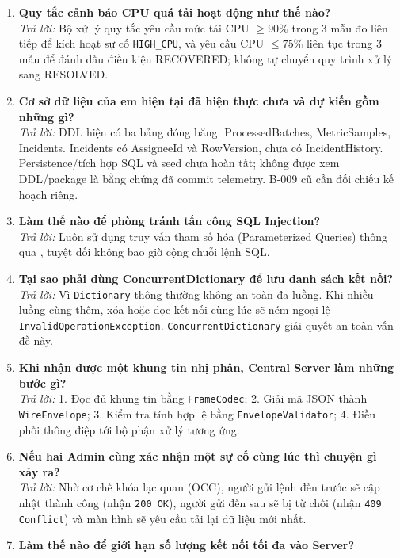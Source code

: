 \documentclass[12pt,a4paper]{article}
\begin{document}
\begin{enumerate}[leftmargin=*, label=\textbf{Câu \arabic*:}]
  \item \textbf{Quy tắc cảnh báo CPU quá tải hoạt động như thế nào?} \\
    \textit{Trả lời:} Bộ xử lý quy tắc yêu cầu mức tải CPU $\ge 90\%$ trong 3 mẫu đo liên tiếp để kích hoạt sự cố \texttt{HIGH\_CPU}, và yêu cầu CPU $\le 75\%$ liên tục trong 3 mẫu để đánh dấu điều kiện RECOVERED; không tự chuyển quy trình xử lý sang RESOLVED.
  \item \textbf{Cơ sở dữ liệu của em hiện tại đã hiện thực chưa và dự kiến gồm những gì?} \\
    \textit{Trả lời:} DDL hiện có ba bảng đóng băng: ProcessedBatches, MetricSamples, Incidents. Incidents có AssigneeId và RowVersion, chưa có IncidentHistory. Persistence/tích hợp SQL và seed chưa hoàn tất; không được xem DDL/package là bằng chứng đã commit telemetry. B-009 cũ cần đối chiếu kế hoạch riêng.
  \item \textbf{Làm thế nào để phòng tránh tấn công SQL Injection?} \\
    \textit{Trả lời:} Luôn sử dụng truy vấn tham số hóa (Parameterized Queries) thông qua , tuyệt đối không bao giờ cộng chuỗi lệnh SQL.
  \item \textbf{Tại sao phải dùng ConcurrentDictionary để lưu danh sách kết nối?} \\
    \textit{Trả lời:} Vì \texttt{Dictionary} thông thường không an toàn đa luồng. Khi nhiều luồng cùng thêm, xóa hoặc đọc kết nối cùng lúc sẽ ném ngoại lệ \texttt{InvalidOperationException}. \texttt{Concurrent\allowbreak{}Dictionary} giải quyết an toàn vấn đề này.
  \item \textbf{Khi nhận được một khung tin nhị phân, Central Server làm những bước gì?} \\
    \textit{Trả lời:} 1. Đọc đủ khung tin bằng \texttt{FrameCodec}; 2. Giải mã JSON thành \texttt{WireEnvelope}; 3. Kiểm tra tính hợp lệ bằng \texttt{EnvelopeValidator}; 4. Điều phối thông điệp tới bộ phận xử lý tương ứng.
  \item \textbf{Nếu hai Admin cùng xác nhận một sự cố cùng lúc thì chuyện gì xảy ra?} \\
    \textit{Trả lời:} Nhờ cơ chế khóa lạc quan (OCC), người gửi lệnh đến trước sẽ cập nhật thành công (nhận \texttt{200 OK}), người gửi đến sau sẽ bị từ chối (nhận \texttt{409 Conflict}) và màn hình sẽ yêu cầu tải lại dữ liệu mới nhất.
  \item \textbf{Làm thế nào để giới hạn số lượng kết nối tối đa vào Server?} \\

\end{enumerate}
\end{document}
